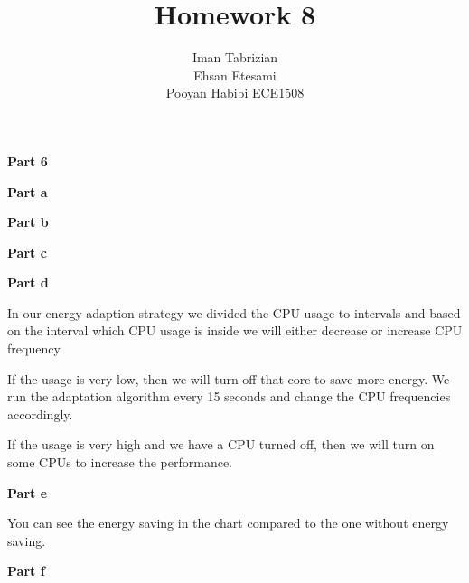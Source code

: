 \documentclass[12pt]{article}
\begin{document}
 
 
\title{Homework 8}
\author{Iman Tabrizian\\ %
	Ehsan Etesami\\
	Pooyan Habibi
ECE1508}

\maketitle

\vspace{5mm} 
\textbf{Part 6}

\vspace{2mm} 

\vspace{5mm} 
\textbf{Part a}

\vspace{2mm} 

\vspace{5mm} 
\textbf{Part b}

\vspace{2mm} 


\vspace{5mm} 
\textbf{Part c}

\vspace{2mm} 

\vspace{5mm} 
\textbf{Part d}

\vspace{2mm} 

In our energy adaption strategy we divided the CPU usage to intervals and based
on the interval which CPU usage is inside we will either decrease or increase
CPU frequency.

If the usage is very low, then we will turn off that core to save more energy.
We run the adaptation algorithm every 15 seconds and change the CPU frequencies
accordingly.

If the usage is very high and we have a CPU turned off, then we will turn on
some CPUs to increase the performance.

\vspace{5mm} 
\textbf{Part e}

\vspace{2mm} 

You can see the energy saving in the chart compared to the one without energy saving.


\vspace{5mm} 
\textbf{Part f}

\vspace{2mm} 
\end{document}
